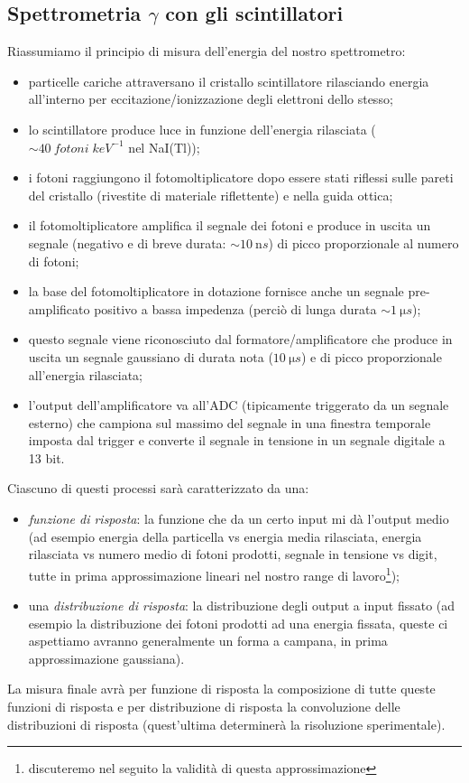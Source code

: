 \subsection{Spettrometria $\gamma$ con gli scintillatori}
Riassumiamo il principio di misura dell'energia del nostro spettrometro:
\begin{itemize}
	\item particelle cariche attraversano il cristallo scintillatore rilasciando energia all'interno per eccitazione/ionizzazione degli elettroni dello stesso;
	\item lo scintillatore produce luce in funzione dell'energia rilasciata ($\sim \SI{40}{fotoni \; keV^{-1}}$ nel NaI(Tl));
	\item i fotoni raggiungono il fotomoltiplicatore dopo essere stati riflessi sulle pareti del cristallo (rivestite di materiale riflettente) e nella guida ottica;
	\item il fotomoltiplicatore amplifica il segnale dei fotoni e produce in uscita un segnale (negativo e di breve durata: $\sim \SI{10}{\nano s}$) di picco proporzionale al numero di fotoni;
	\item la base del fotomoltiplicatore in dotazione fornisce anche un segnale pre-amplificato positivo a bassa impedenza (perciò di lunga durata $\sim \SI{1}{\micro s}$);
	\item questo segnale viene riconosciuto dal formatore/amplificatore che produce in uscita un segnale gaussiano di durata nota ($\SI{10}{\micro s}$) e di picco proporzionale all'energia rilasciata;
	\item l'output dell'amplificatore va all'ADC (tipicamente triggerato da un segnale esterno) che campiona sul massimo del segnale in una finestra temporale imposta dal trigger e converte il segnale in tensione in un segnale digitale a 13 bit.
\end{itemize}
Ciascuno di questi processi sarà caratterizzato da una:
\begin{itemize}
	\item\emph{funzione di risposta}: la funzione che da un certo input mi dà l'output medio (ad esempio energia della particella vs energia media rilasciata, energia rilasciata vs numero medio di fotoni prodotti, segnale in tensione vs digit, tutte in prima approssimazione lineari nel nostro range di lavoro\footnote{discuteremo nel seguito la validità di questa approssimazione});
    \item una \emph{distribuzione di risposta}: la distribuzione degli output a input fissato (ad esempio la distribuzione dei fotoni prodotti ad una energia fissata, queste ci aspettiamo avranno generalmente un forma a campana, in prima approssimazione gaussiana).
\end{itemize}
La misura finale avrà per funzione di risposta la composizione di tutte queste funzioni di risposta e per distribuzione di risposta la convoluzione delle distribuzioni di risposta (quest'ultima determinerà la risoluzione sperimentale).

